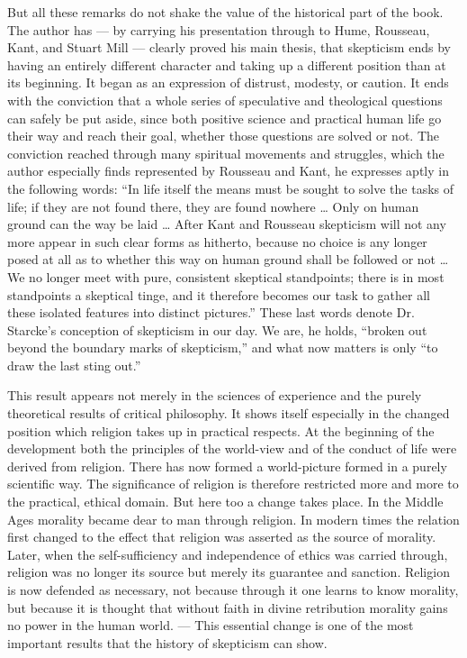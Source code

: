 \documentclass[12pt,a4paper,openany]{book}
\newcommand{\opage}[1]{\marginnote{\footnotesize\textit{[#1]}}}
\begin{document}
But all these remarks do not shake the value
of the historical part of the book. The author has --- by
carrying his presentation through to Hume, Rousseau, Kant, and
Stuart Mill --- clearly proved his main thesis, that
skepticism ends by having an entirely different character and taking up
a different position than at its beginning. It began
\opage{25}as an expression of distrust, modesty, or caution.
It ends with the conviction that a whole series of
speculative and theological questions can safely be put aside,
since both positive science and practical
human life go their way and reach their goal, whether those
questions are solved or not. The conviction reached through many spiritual
movements and struggles, which the author especially
finds represented by Rousseau and Kant, he expresses
aptly in the following words: ``In life itself the means must be sought
to solve the tasks of life; if they are not found there, they are found
nowhere \ldots{} Only on human ground can the way
be laid \ldots{} After Kant and Rousseau skepticism will not
any more appear in such clear forms as hitherto, because
no choice is any longer posed at all as to whether
this way on human ground shall be followed or not \ldots{}
We no longer meet with pure, consistent skeptical
standpoints; there is in most standpoints a skeptical
tinge, and it therefore becomes our task to gather all these
isolated features into distinct pictures.'' These last words
denote Dr. Starcke's conception of skepticism in our day.
We are, he holds, ``broken out beyond the boundary marks
of skepticism,'' and what now matters is only ``to draw
the last sting out.''

This result appears not merely in
the sciences of experience and the purely theoretical results of critical philosophy.
It shows itself especially in the changed position which religion
takes up in practical respects. At the beginning of the development
both the principles of the world-view and of the conduct of life
were derived from religion. There has now formed a
world-picture formed in a purely scientific way. The significance of religion
is therefore restricted more and more to the practical,
ethical domain. But here too a change takes place.
In the Middle Ages morality became dear to man through
religion. In modern times the relation first changed to the effect
that religion was asserted as the source of morality. Later, when
the self-sufficiency and independence of ethics was carried through,
religion was no longer its source but merely its guarantee
and sanction. Religion is now defended as necessary, not
because through it one learns to know morality, but because
\opage{26}it is thought that without faith in divine retribution
morality gains no power in the human world. --- This
essential change is one of the most important results
that the history of skepticism can show.
\end{document}
